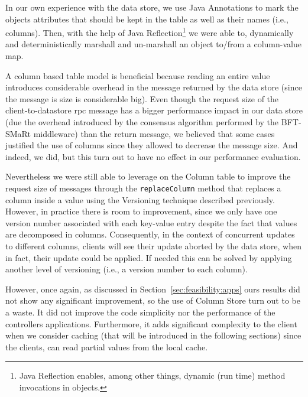 In our own experience with the data store, we use Java Annotations to mark the objects attributes that should be kept in the table  as well as their names (i.e., columns). 
Then, with the help of Java Reflection\footnote{Java Reflection enables, among other things, dynamic (run time) method invocations in objects.} we were able to, dynamically and deterministically marshall and un-marshall an object to/from a column-value map.  


A column based table model is beneficial because reading an entire value introduces considerable overhead in the message returned by the data store (since the message is size is considerable big).
Even though the request size of the client-to-datastore \gls{rpc} message has a bigger performance impact in our data store (due the overhead introduced by the consensus algorithm performed by the BFT-SMaRt middleware) than the return message, we believed that some cases justified the use of columns since they allowed to decrease the message size. 
And indeed, we did, but this turn out to have no effect in our performance evaluation.
 
Nevertheless we were still able to leverage on the Column table to improve the request size of messages through the \texttt{replaceColumn} method  that replaces a column inside a value using the Versioning technique described previously. 
However, in practice there is room to improvement, since we only have one version number associated with each key-value entry despite the fact that values are decomposed in columns. 
Consequently, in the context of concurrent updates to different columns, clients will see their update aborted by the data store, when in fact, their update could be applied. 
If needed this can be solved by applying another level of versioning (i.e., a version number to each column). 

However, once again,  as discussed in Section~\ref{sec:feasibility:apps} ours results did not show any significant improvement, so the use of Column Store turn out to be a waste. It did not improve  the code simplicity nor the performance of the controllers applications. 
Furthermore, it adds significant complexity to the client when we consider caching (that will be introduced in the following sections) since the clients, can read partial values from the local cache. 

